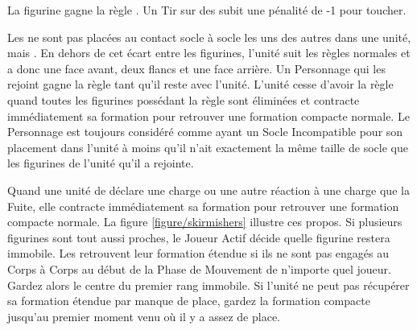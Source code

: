 
La figurine gagne la règle \newfromWHB{\lighttroops}. Un Tir sur des \skirmishers{} subit une pénalité de -1 pour toucher.

Les \skirmishers{} ne sont pas placées au contact socle à socle les uns des autres dans une unité, mais . En dehors de cet écart entre les figurines, l'unité suit les règles normales et a donc une face avant, deux flancs et une face arrière.  Un Personnage qui les rejoint gagne la règle \skirmisher{} tant qu'il reste avec l'unité. L'unité cesse d'avoir la règle \skirmisher{} quand toutes les figurines possédant la règle sont éliminées et contracte immédiatement sa formation pour retrouver une formation compacte normale. Le Personnage est toujours considéré comme ayant un Socle Incompatible pour son placement dans l'unité à moins qu'il n'ait exactement la même taille de socle que les figurines de l'unité qu'il a rejointe.

Quand une unité de \skirmishers{} déclare une charge ou une autre réaction à une charge que la Fuite, elle contracte immédiatement sa formation pour retrouver une formation compacte normale.  La figure \ref{figure/skirmishers} illustre ces propos. Si plusieurs figurines sont tout aussi proches, le Joueur Actif décide quelle figurine restera immobile. Les \skirmishers{} retrouvent leur formation étendue si ils ne sont pas engagés au Corps à Corps au début de la Phase de Mouvement de n'importe quel joueur. Gardez alors le centre du premier rang immobile. Si l'unité ne peut pas récupérer sa formation étendue par manque de place, gardez la formation compacte jusqu'au premier moment venu où il y a assez de place.

\newcommand{\figSkirmiA}{a)}
\newcommand{\figSkirmiB}{b)}
\newcommand{\figSkirmiC}{c)}
\newcommand{\figSkirmiD}{d)}
\newcommand{\figSkirmiDist}{\smallfontsize 0,5\distance{}}
\newcommand{\figSkirmiCharge}{\textit{Charge !}}
\newcommand{\figSkirmiStandAndShoot}{\textit{Tenez la Position et Tirez !}}
\newcommand{\figSkirmiHold}{\textit{Tenez la Position !}}

